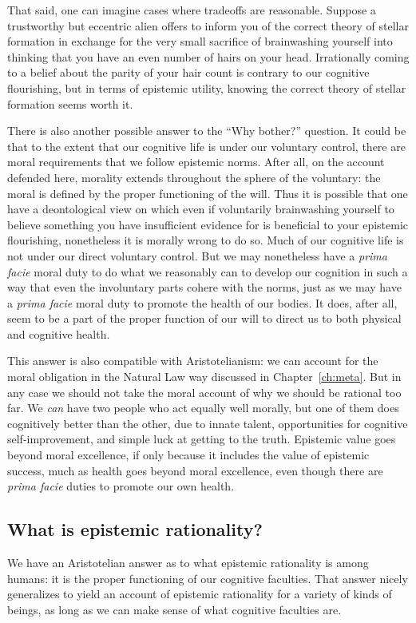 That said, one can imagine cases where tradeoffs are reasonable. Suppose a trustworthy but eccentric alien
offers to inform you of the correct theory of stellar formation in exchange for the very small sacrifice 
of brainwashing yourself into thinking that you have an even number of hairs on your head. Irrationally
coming to a belief about the parity of your hair count is contrary to our cognitive flourishing, but in terms 
of epistemic utility, knowing the correct theory of stellar formation seems worth it.

There is also another possible answer to the ``Why bother?'' question. It could be that to the extent
that our cognitive life is under our voluntary control, there are moral requirements that we follow epistemic
norms. After all, on the account defended here, morality extends throughout the sphere of the voluntary: 
the moral is defined by the proper functioning of the will. Thus it is possible that one have a deontological
view on which even if voluntarily brainwashing yourself to believe something you have insufficient evidence 
for is beneficial to your epistemic flourishing, nonetheless it is morally wrong to do so. 
Much of our cognitive life is not under our direct voluntary control. But we may nonetheless have a 
\textit{prima facie} moral duty  to do what we reasonably can to develop our cognition in such a way that even the 
involuntary parts cohere with the norms, just as we may have a \textit{prima facie} moral duty to promote the 
health of our bodies. It does, after all, seem to be a part of the proper function of our will to direct us to 
both physical and cognitive health.

This answer is also compatible with Aristotelianism: we can account for the moral obligation in the Natural Law
way discussed in Chapter~\ref{ch:meta}. But in any case we should not take the moral account of why we should be 
rational too far. We \textit{can} have two people who act equally well morally, but one 
of them does cognitively better than the other, due to innate talent, opportunities for cognitive self-improvement,
and simple luck at getting to the truth. Epistemic value goes beyond moral excellence, if only because it includes 
the value of epistemic success, much as health goes beyond moral excellence, even though there are \textit{prima 
facie} duties to promote our own health.

\subsection{What is epistemic rationality?}
We have an Aristotelian answer as to what epistemic rationality is among humans: it is the proper functioning of 
our cognitive faculties. That answer nicely generalizes to yield an account of epistemic rationality for a variety 
of kinds of beings, as long as we can make sense of what cognitive faculties are. 


